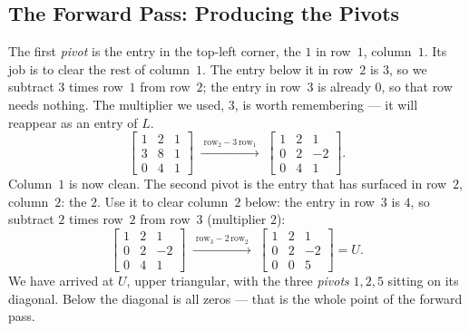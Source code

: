 \subsection{The Forward Pass: Producing the Pivots}

The first \emph{pivot} is the entry in the top-left corner, the $1$ in row~$1$, column~$1$. Its job is to clear the rest of column~$1$. The entry below it in row~$2$ is $3$, so we subtract $3$ times row~$1$ from row~$2$; the entry in row~$3$ is already $0$, so that row needs nothing. The multiplier we used, $3$, is worth remembering --- it will reappear as an entry of $L$.
\[
\begin{bmatrix} 1 & 2 & 1\\ 3 & 8 & 1\\ 0 & 4 & 1\end{bmatrix}
\;\xrightarrow{\;\text{row}_2-3\,\text{row}_1\;}\;
\begin{bmatrix} 1 & 2 & 1\\ 0 & 2 & -2\\ 0 & 4 & 1\end{bmatrix}.
\]
Column~$1$ is now clean. The second pivot is the entry that has surfaced in row~$2$, column~$2$: the $2$. Use it to clear column~$2$ below: the entry in row~$3$ is $4$, so subtract $2$ times row~$2$ from row~$3$ (multiplier $2$):
\[
\begin{bmatrix} 1 & 2 & 1\\ 0 & 2 & -2\\ 0 & 4 & 1\end{bmatrix}
\;\xrightarrow{\;\text{row}_3-2\,\text{row}_2\;}\;
\begin{bmatrix} 1 & 2 & 1\\ 0 & 2 & -2\\ 0 & 0 & 5\end{bmatrix}=U.
\]
We have arrived at $U$, upper triangular, with the three \emph{pivots} $1,2,5$ sitting on its diagonal. Below the diagonal is all zeros --- that is the whole point of the forward pass.


